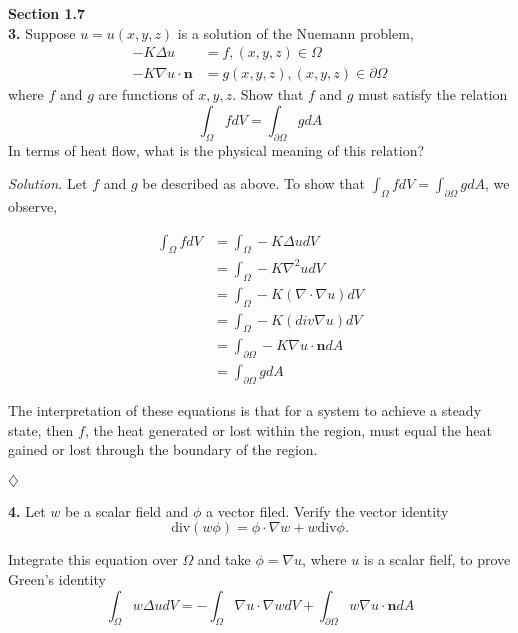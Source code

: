 \documentclass{article}
\begin{document}
\setlength{\parindent}{0cm}   %



\noindent
\textbf{Section 1.7}  
\\
\textbf{3.}  Suppose \(u=u(x,y,z)\) is a solution of the Nuemann problem,
\begin{align*}
-K \Delta u &= f, (x,y,z) \in \Omega \\
-K \nabla u \cdot \textbf{n} &= g(x,y,z), (x,y,z) \in \partial \Omega
\end{align*}
 where \(f\) and \(g\) are functions of \(x,y,z\). Show that \(f\) and \(g\) must satisfy the relation 
 \[
 \int_\Omega f dV = \int_{\partial \Omega} g dA
 \]
 In terms of heat flow, what is the physical meaning of this relation?

\vspace{3mm} 

\textit{Solution.} Let \(f\) and \(g\) be described as above. To show that \( \int_\Omega f dV = \int_{\partial \Omega} g dA\), we observe,

\begin{align*}
 \int_\Omega f dV  &= \int_\Omega -K \Delta u dV \\
&= \int_\Omega -K \nabla^2 u dV \\
&= \int_\Omega -K( \nabla \cdot \nabla u )dV \\
&= \int_\Omega -K ( div \nabla u) dV \\
&= \int_{\partial \Omega}  -K \nabla u \cdot \textbf{n} dA \\
&= \int_{\partial \Omega} g dA
\end{align*}

The interpretation of these equations is that for a system to achieve a steady state, then \(f\), the heat generated or lost within the region, must equal the heat gained or lost through the boundary of the region. 

\begin{flushright}
\( \diamondsuit \)
\end{flushright}

\vspace{3mm}
\textbf{4.} Let \(w\) be a scalar field and \(\phi\) a vector filed. Verify the vector identity
\[
\text{div}(w\phi) = \phi \cdot  \nabla w + w \text{div} \phi.
\]
 
Integrate this equation over \(\Omega\) and take \(\phi=\nabla u\), where \(u\) is a scalar fielf, to prove Green's identity
\[
\int_\Omega w \Delta u dV = -\int_\Omega \nabla u \cdot \nabla w dV + \int_{\partial \Omega} w \nabla u \cdot \textbf{n} dA
\]
\end{document}

